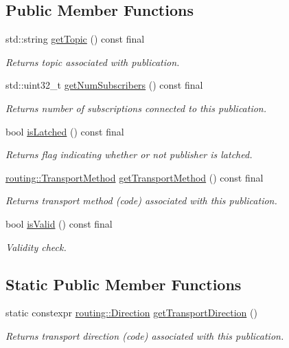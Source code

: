 \subsection*{Public Member Functions}
\begin{DoxyCompactItemize}
\item 
std\+::string \hyperlink{classflow__ros_1_1_publisher_output_base_a28d4636b7d52e0dac54f27556308e9d4}{get\+Topic} () const final
\begin{DoxyCompactList}\small\item\em Returns topic associated with publication. \end{DoxyCompactList}\item 
std\+::uint32\+\_\+t \hyperlink{classflow__ros_1_1_publisher_output_base_a8f51f3d329d65aad7d0f9ea6b4f3c4b6}{get\+Num\+Subscribers} () const final
\begin{DoxyCompactList}\small\item\em Returns number of subscriptions connected to this publication. \end{DoxyCompactList}\item 
bool \hyperlink{classflow__ros_1_1_publisher_output_base_a34acf851a9aa31ece46b6b5887b3db24}{is\+Latched} () const final
\begin{DoxyCompactList}\small\item\em Returns flag indicating whether or not publisher is latched. \end{DoxyCompactList}\item 
\hyperlink{transport__info_8h_ae57afcf849a5bdb82b958347c6ccc57b}{routing\+::\+Transport\+Method} \hyperlink{classflow__ros_1_1_publisher_output_base_ac052232bb5a6fb9ea04ab61453d14f69}{get\+Transport\+Method} () const final
\begin{DoxyCompactList}\small\item\em Returns transport method (code) associated with this publication. \end{DoxyCompactList}\item 
bool \hyperlink{classflow__ros_1_1_publisher_output_base_a60ffa435ac1243b046d8029584c097a3}{is\+Valid} () const final
\begin{DoxyCompactList}\small\item\em Validity check. \end{DoxyCompactList}\end{DoxyCompactItemize}
\subsection*{Static Public Member Functions}
\begin{DoxyCompactItemize}
\item 
static constexpr \hyperlink{transport__info_8h_acb4b6ac875de32a0d0ee8cec235f7752}{routing\+::\+Direction} \hyperlink{classflow__ros_1_1_publisher_output_base_a4f42e2bf09aa92117879071652a0df17}{get\+Transport\+Direction} ()
\begin{DoxyCompactList}\small\item\em Returns transport direction (code) associated with this publication. \end{DoxyCompactList}\end{DoxyCompactItemize}
